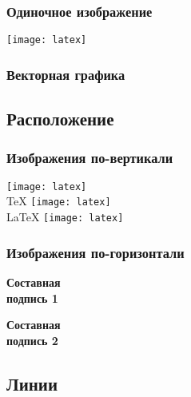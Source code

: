 \begin{frame}
    \frametitle{Одиночное изображение}
    \centering
    \texttt{[image: latex]} %
\end{frame}

\begin{frame}
    \frametitle{Векторная графика}
    \begin{figure}
	    \centering
	    
    \end{figure}
\end{frame}

\subsection{Расположение}

\begin{frame}
    \frametitle{Изображения по-вертикали}
    \centering
    \vfill
    \texttt{[image: latex]} \\
    \TeX
    \vfill
    \texttt{[image: latex]} \\
    \LaTeX
    \vfill
    \texttt{[image: latex]} \\
    \vfill
\end{frame}


\begin{frame}
    \frametitle{Изображения по-горизонтали}
    \begin{minipage}[t]{0.47\linewidth}
        \textbf{Составная \\ подпись 1}
    \end{minipage}
    \hfill
    \begin{minipage}[t]{0.47\linewidth}
        \textbf{Составная \\ подпись 2}
    \end{minipage}
\end{frame}

\subsection{Линии}

